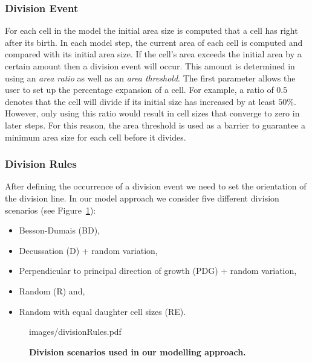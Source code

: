 \documentclass[11pt,a4paper, final]{article}
\newenvironment{Itemize}{
  \begin{itemize}[leftmargin=0.5cm]{
}}{\end{itemize}}
\begin{document}
\subsubsection{Division Event}
\noindent
For each cell in the model the initial area size is computed that a cell has right after its birth. In each model step, the current area of each cell is computed and compared with its initial area size. If the cell's area exceeds the initial area by a certain amount then a division event will occur. This amount is determined in using an \textit{area ratio} as well as an \textit{area threshold}. The first parameter allows the user to set up the percentage expansion of a cell. For example, a ratio of $0.5$ denotes that the cell will divide if its initial size has increased by at least $50\%$. However, only using this ratio would result in cell sizes that converge to zero in later steps. For this reason, the area threshold is used as a barrier to guarantee a minimum area size for each cell before it divides.

\subsubsection{Division Rules}
\label{sec:divisionRules}
\noindent
After defining the occurrence of a division event we need to set the orientation of the division line. In our model approach we consider five different division scenarios (see Figure~\ref{fig:divisionRules}):
\begin{Itemize}
\item Besson-Dumais (BD),
\item Decussation (D) + random variation,
\item Perpendicular to principal direction of growth (PDG) + random variation,
\item Random (R) and,
\item Random with equal daughter cell sizes (RE).
\end{Itemize}
%
\begin{figure}[htbp]
	\begin{center}
		\begin{overpic}[width=1.\linewidth]{images/divisionRules.pdf}
		\end{overpic}
\caption[Division scenarios used in our modelling approach.]
{
{\bf Division scenarios used in our modelling approach.}
}
	\label{fig:divisionRules}
	\end{center}
\end{figure}
%
\end{document}
